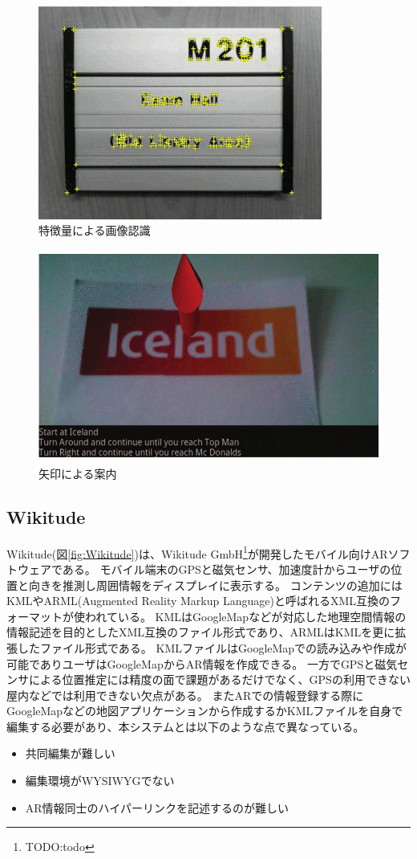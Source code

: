 \begin{figure}[h]
  \centering 
  \includegraphics[height=70mm]{images/FBINUAR_image.png}
  \caption{特徴量による画像認識} \label{fig:FBINUAR_image}
\end{figure}
\begin{figure}[h]
  \centering 
  \includegraphics[height=70mm]{images/FBINUAR_ar.png}
  \caption{矢印による案内} \label{fig:FBINUAR_ar}
\end{figure}


\subsection{Wikitude}
Wikitude(図\ref{fig:Wikitude})は、Wikitude GmbH\footnote{\textsf{TODO:todo}}が開発したモバイル向けARソフトウェアである。
モバイル端末のGPSと磁気センサ、加速度計からユーザの位置と向きを推測し周囲情報をディスプレイに表示する。
コンテンツの追加にはKMLやARML(Augmented Reality Markup Language)と呼ばれるXML互換のフォーマットが使われている。
KMLはGoogleMapなどが対応した地理空間情報の情報記述を目的としたXML互換のファイル形式であり、ARMLはKMLを更に拡張したファイル形式である。
KMLファイルはGoogleMapでの読み込みや作成が可能でありユーザはGoogleMapからAR情報を作成できる。
一方でGPSと磁気センサによる位置推定には精度の面で課題があるだけでなく、GPSの利用できない屋内などでは利用できない欠点がある。
またARでの情報登録する際にGoogleMapなどの地図アプリケーションから作成するかKMLファイルを自身で編集する必要があり、本システムとは以下のような点で異なっている。
\begin{itemize}
  \item 共同編集が難しい
  \item 編集環境がWYSIWYGでない
  \item AR情報同士のハイパーリンクを記述するのが難しい
\end{itemize}

